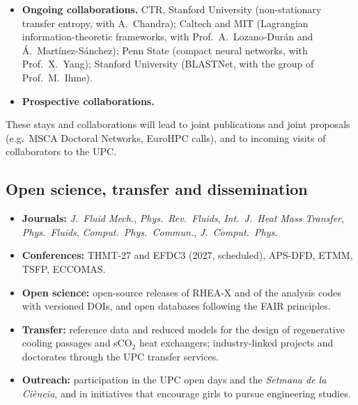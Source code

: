 \documentclass[11pt]{article}
\begin{document}
\begin{itemize}
  whose junior modality funds stays of young doctors with a teaching or research contract
  at a Spanish university and reserves part of its stays in the USA for the Fulbright
  program. The call usually opens in January--February, so the application would be
  submitted in year~2, after the Salento stay, for a stay in year~3.
  \item \textbf{Ongoing collaborations.} CTR, Stanford University (non-stationary transfer
  entropy, with A.\ Chandra); Caltech and MIT (Lagrangian information-theoretic
  frameworks, with Prof.\ A.\ Lozano-Dur\'an and \'A.\ Mart\'inez-S\'anchez); Penn State
  (compact neural networks, with Prof.\ X.\ Yang); Stanford University (BLASTNet, with the
  group of Prof.\ M.\ Ihme).
  \item \textbf{Prospective collaborations.} 
\end{itemize}
These stays and collaborations will lead to joint publications and joint proposals (e.g.\
MSCA Doctoral Networks, EuroHPC calls), and to incoming visits of collaborators to the
UPC.

\subsection{Open science, transfer and dissemination}\label{sec:dissemination}
\begin{itemize}
  \item \textbf{Journals:} \emph{J.\ Fluid Mech.}, \emph{Phys.\ Rev.\ Fluids},
  \emph{Int.\ J.\ Heat Mass Transfer}, \emph{Phys.\ Fluids}, \emph{Comput.\ Phys.\
  Commun.}, \emph{J.\ Comput.\ Phys.}
  \item \textbf{Conferences:} THMT-27 and EFDC3 (2027, scheduled), APS-DFD, ETMM, TSFP,
  ECCOMAS.
  \item \textbf{Open science:} open-source releases of RHEA-X and of the analysis codes with
  versioned DOIs, and open databases following the FAIR principles.
  \item \textbf{Transfer:} reference data and reduced models for the design of
  regenerative cooling passages and sCO$_2$ heat exchangers; industry-linked projects and
  doctorates through the UPC transfer services.
  \item \textbf{Outreach:} participation in the UPC open days and the \emph{Setmana de la
  Ci\`encia}, and in initiatives that encourage girls to pursue engineering studies.
\end{itemize}
\end{document}
